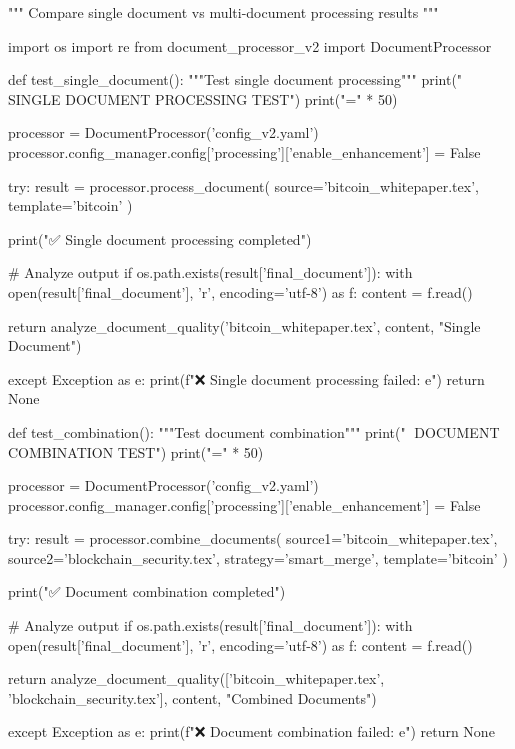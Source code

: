 """
Compare single document vs multi-document processing results
"""

import os
import re
from document_processor_v2 import DocumentProcessor

def test_single_document():
    """Test single document processing"""
    print("🔄 SINGLE DOCUMENT PROCESSING TEST")
    print("=" * 50)
    
    processor = DocumentProcessor('config_v2.yaml')
    processor.config_manager.config['processing']['enable_enhancement'] = False
    
    try:
        result = processor.process_document(
            source='bitcoin_whitepaper.tex',
            template='bitcoin'
        )
        
        print("✅ Single document processing completed")
        
        # Analyze output
        if os.path.exists(result['final_document']):
            with open(result['final_document'], 'r', encoding='utf-8') as f:
                content = f.read()
            
            return analyze_document_quality('bitcoin_whitepaper.tex', content, "Single Document")
        
    except Exception as e:
        print(f"❌ Single document processing failed: {e}")
        return None

def test_combination():
    """Test document combination"""
    print("\n🔄 DOCUMENT COMBINATION TEST")
    print("=" * 50)
    
    processor = DocumentProcessor('config_v2.yaml')
    processor.config_manager.config['processing']['enable_enhancement'] = False
    
    try:
        result = processor.combine_documents(
            source1='bitcoin_whitepaper.tex',
            source2='blockchain_security.tex',
            strategy='smart_merge',
            template='bitcoin'
        )
        
        print("✅ Document combination completed")
        
        # Analyze output
        if os.path.exists(result['final_document']):
            with open(result['final_document'], 'r', encoding='utf-8') as f:
                content = f.read()
            
            return analyze_document_quality(['bitcoin_whitepaper.tex', 'blockchain_security.tex'], content, "Combined Documents")
        
    except Exception as e:
        print(f"❌ Document combination failed: {e}")
        return None


